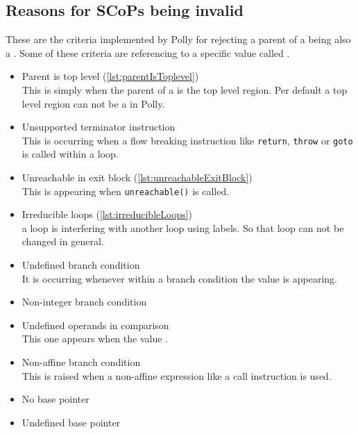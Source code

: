 \subsection{Reasons for SCoPs being invalid}
These are the criteria implemented by Polly for rejecting a parent of a \scop being also a \scop.
Some of these criteria are referencing to a \llvm specific value called \undefv.\cite{llvmUndef}
\begin{itemize}
    \item Parent is top level (\autoref{lst:parentIsToplevel})\\
        This is simply when the parent of a \scop is the top level region.
        Per default a top level region can not be a \scop in Polly.
    \item Unsupported terminator instruction\\
        This is occurring when a flow breaking instruction like \texttt{return}, \texttt{throw} or \texttt{goto} is called within a loop.
    \item Unreachable in exit block (\autoref{lst:unreachableExitBlock})\\
        This is appearing when \texttt{unreachable()} is called.\cite{llvmUnreachable}
    \item Irreducible loops (\autoref{lst:irreducibleLoops})\\
        \Eg a loop is interfering with another loop using labels.
        So that loop can not be changed in general.
    \item Undefined branch condition\\
        It is occurring whenever within a branch condition the value \undefv is appearing.
    \item Non-integer branch condition\\
    \item Undefined operands in comparison\\
        This one appears when the value \undefv.
    \item Non-affine branch condition\\
        This is raised when a non-affine expression like a call instruction is used.
    \item No base pointer\\
    \item Undefined base pointer\\

\end{itemize}
